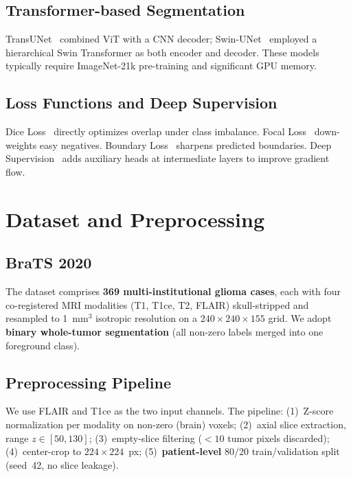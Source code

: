 \documentclass[10pt,twocolumn]{article}
\begin{document}
\subsection{Transformer-based Segmentation}
TransUNet~\cite{chen2021} combined ViT with a CNN decoder; Swin-UNet~\cite{cao2022}
employed a hierarchical Swin Transformer as both encoder and decoder. These models
typically require ImageNet-21k pre-training and significant GPU memory.

\subsection{Loss Functions and Deep Supervision}
Dice Loss~\cite{milletari2016} directly optimizes overlap under class imbalance. Focal
Loss~\cite{lin2017} down-weights easy negatives. Boundary Loss~\cite{kervadec2019}
sharpens predicted boundaries. Deep Supervision~\cite{lee2015} adds auxiliary heads at
intermediate layers to improve gradient flow.

\section{Dataset and Preprocessing}

\subsection{BraTS 2020}
The dataset comprises \textbf{369 multi-institutional glioma cases}, each with four
co-registered MRI modalities (T1, T1ce, T2, FLAIR) skull-stripped and resampled to
1~mm$^3$ isotropic resolution on a $240\!\times\!240\!\times\!155$ grid. We adopt
\textbf{binary whole-tumor segmentation} (all non-zero labels merged into one foreground
class).

\subsection{Preprocessing Pipeline}
We use FLAIR and T1ce as the two input channels. The pipeline:
(1)~Z-score normalization per modality on non-zero (brain) voxels;
(2)~axial slice extraction, range $z \in [50,130]$;
(3)~empty-slice filtering (${<}10$ tumor pixels discarded);
(4)~center-crop to $224\!\times\!224$~px;
(5)~\textbf{patient-level} 80/20 train/validation split (seed~42, no slice leakage).
\end{document}
